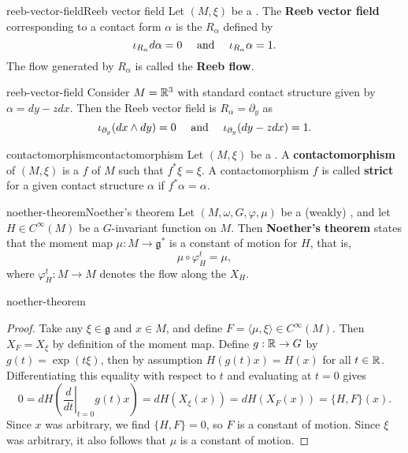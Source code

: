 \begin{topic}{reeb-vector-field}{Reeb vector field}
    Let $(M, \xi)$ be a . The \textbf{Reeb vector field} corresponding to a contact form $\alpha$ is the  $R_\alpha$ defined by
    \[ \iota_{R_\alpha} d \alpha = 0 \quad \textup{ and } \quad \iota_{R_\alpha} \alpha = 1 . \]
    The flow generated by $R_\alpha$ is called the \textbf{Reeb flow}.
\end{topic}

\begin{example}{reeb-vector-field}
    Consider $M = \mathbb{R}^3$ with standard contact structure given by $\alpha = dy - z dx$. Then the Reeb vector field is $R_\alpha = \partial_y$ as
    \[ \iota_{\partial_y} (dx \wedge dy) = 0 \quad \textup{ and } \quad \iota_{\partial_y} (dy - z dx) = 1 . \]
\end{example}

\begin{topic}{contactomorphism}{contactomorphism}
    Let $(M, \xi)$ be a . A \textbf{contactomorphism} of $(M, \xi)$ is a  $f$ of $M$ such that $f^* \xi = \xi$. A contactomorphism $f$ is called \textbf{strict} for a given contact structure $\alpha$ if $f^* \alpha = \alpha$.
\end{topic}

\begin{topic}{noether-theorem}{Noether's theorem}
    Let $(M, \omega, G, \varphi, \mu)$ be a (weakly) , and let $H \in C^\infty(M)$ be a $G$-invariant function on $M$. Then \textbf{Noether's theorem} states that the moment map $\mu : M \to \mathfrak{g}^*$ is a constant of motion for $H$, that is,
    \[ \mu \circ \varphi_H^t = \mu , \]
    where $\varphi_H^t : M \to M$ denotes the flow along the  $X_H$.
\end{topic}

\begin{example}{noether-theorem}
    \begin{proof}
        Take any $\xi \in \mathfrak{g}$ and $x \in M$, and define $F = \langle \mu, \xi \rangle \in C^\infty(M)$. Then $X_F = X_\xi$ by definition of the moment map. Define $g : \mathbb{R} \to G$ by $g(t) = \exp(t \xi)$, then by assumption $H(g(t) x) = H(x)$ for all $t \in \mathbb{R}$. Differentiating this equality with respect to $t$ and evaluating at $t = 0$ gives
        \[ 0 = dH \left(\left.\frac{d}{dt}\right|_{t = 0} g(t) x\right) = dH \left(X_\xi(x)\right) = dH(X_F(x)) = \{ H, F \}(x) . \]
        Since $x$ was arbitrary, we find $\{ H, F \} = 0$, so $F$ is a constant of motion. Since $\xi$ was arbitrary, it also follows that $\mu$ is a constant of motion.
    \end{proof}
\end{example}

